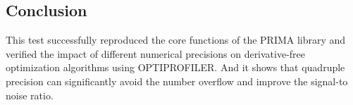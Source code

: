\documentclass[a4paper,12pt]{article}
\begin{document}
\subsection{Conclusion}
This test successfully reproduced the core functions of the PRIMA library and verified the impact of different numerical precisions on derivative-free optimization algorithms using OPTIPROFILER. And it shows that quadruple precision can significantly avoid the number overflow and improve the signal-to noise ratio.
\end{document}
